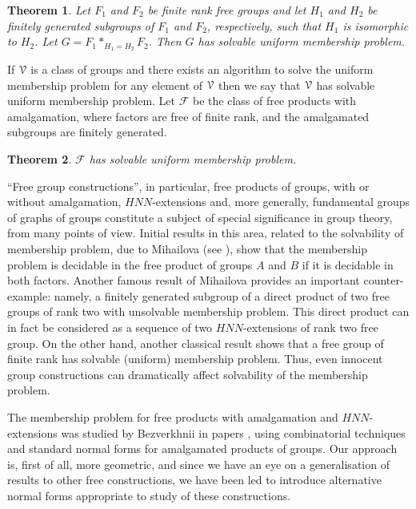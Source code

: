 \documentclass[a4paper,12pt]{article}
\newcommand{\cF}{{\cal{F}}}
\newcommand{\cV}{{\cal{V}}}
\newtheorem{theorem}{Theorem}[section]
\numberwithin{equation}{section}
\numberwithin{figure}{section}
\renewcommand{\cF}{\mathcal{F}}
\begin{document}
\begin{theorem}\label{thm:uni-membership}
Let $F_1$ and $F_2$ be finite rank free groups and let $H_1$ and $H_2$ 
be finitely generated subgroups of $F_1$ and $F_2$, respectively, such
that $H_1$ is isomorphic to $H_2$. Let $G=F_1 \ast_{H_1=H_2} F_2$. Then   
$G$ has solvable uniform  membership problem.
\end{theorem}

If $\cV$ is a class of groups and there exists an algorithm to 
solve the uniform membership problem for any element of $\cV$ then 
we say that $\cV$ has solvable uniform  membership problem.
Let $\cF$ be the class of free products with amalgamation, where 
factors are free of finite rank, and the amalgamated subgroups are 
finitely generated.  
\begin{theorem}\label{thm:class-uni-membership}
$\cF$ has solvable uniform  membership problem.
\end{theorem}



``Free group constructions'', in particular, free products of groups,
with or without amalgamation, $HNN$-extensions
 and, more generally, fundamental groups
of graphs of groups constitute a subject of special significance in
group theory, from many points of view. Initial results in this area,
related to the solvability of membership problem,  due to Mihailova (see
\cite{mi59,mi68}), show that the membership problem is
decidable in the free product of groups $A$ and $B$ if it is decidable
in both factors. Another famous result of
Mihailova \cite{mi58}  provides an important counter-example:
 namely,  a finitely generated
subgroup of a direct product of two free groups of rank two with
unsolvable membership problem.  This direct
product can in fact be considered as a sequence of two $HNN$-extensions
of rank two free group. On the other hand, another classical
result \cite[Proposition 2.21]{LS} shows that a free group of finite rank has solvable (uniform)
membership problem. Thus,  even innocent group
constructions can dramatically affect solvability of the membership problem.

The membership problem for free products with amalgamation and
$HNN$-extensions was studied by Bezverkhnii in papers
\cite{bez81,bez86,bez90,bez91}, using  combinatorial
techniques and standard normal forms for  amalgamated products of
groups. Our approach is, first of all, more geometric, and since
we have an eye on a generalisation of results to other free
constructions, we have been led to introduce alternative normal forms
 appropriate to
study of these constructions.
\end{document}
